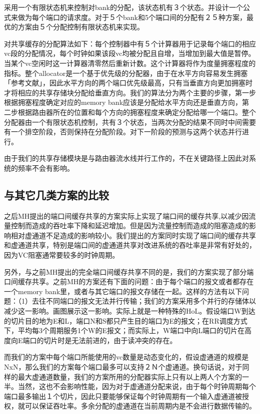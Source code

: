 ﻿\documentclass[10pt,journal]{IEEEtran}
\begin{document}
采用一个有限状态机来控制对bank的分配，该状态机有３个状态。并设计一个公式来做为每个端口的请求度。对于５个bank和5个端口间的分配有２５种方案，最优的方案由５个分配控制有限状态机来实现。

对共享缓存的分配算法如下：每个控制器中有５个计算器用于记录每个端口的相应vc段的分配情况，每个时钟如果该段vc均被分配且自增，当增加到最大值是暂停。当某个vc空闲时这一计算器清零然后重新计数。这个计算器将作为度量拥塞程度的指标。整个allocator是一个基于优先级的分配器，由于在水平方向容易发生拥塞「参考文献」，因此水平方向的两个端口优先级最高，只有当垂直方向更加拥塞时才将相应的共享存储块分配给垂直方向。我们的算法分为两个主要的步骤，第一步根据拥塞程度确定对应的memory bank应该是分配给水平方向还是垂直方向，第二步根据路由器所在的位置和每个方向的拥塞程度来确定分配给哪一个端口。整个分配器由一个有限状态机控制，共有３个状态，当两次分配的结果不同时中间需要有一个排空阶段，否则保持在分配阶段。对下一阶段的预测与这两个状态并行进行。

由于我们的共享存储模块是与路由器流水线并行工作的，不在关键路径上因此对系统的频率不会有影响。

\subsection{与其它几类方案的比较}
之后MH提出的端口间缓存共享的方案实际上实现了端口间的缓存共享,以减少因流量控制而造成的吞吐率下降和延迟增加。但是因为流量控制而造成的阻塞造成的影响相对虚通道不足造成的影响较小。我们提出的方案同时实现了端口间的缓存共享和虚通道共享，特别是端口间的虚通道共享对改进系统的吞吐率是非常有好处的，因为VC阻塞通常要较多的时钟周期。

另外，与之前MH提出的完全端口间缓存共享不同的是，我们的方案实现了部分端口间缓存共享。之前MH的方案还有下面的问题：由于每个端口的报文或者都存在一个memory bank里，或者与其它端口的报文存储在一起。这样的方法有以下问题：（1）去往不同端口的报文无法并行传输；我们的方案采用多个并行的存储体以减少这一影响。画图展示这一影响。实际上就是一种特殊的HoL。假设端口W到达的切片目的地为E和L，端口N和S都只产生目的端口为E的报文；在RR调度方式下，平均每3个周期服务1个W的E报文；而实际上，W端口中向L端口的切片在高度向E端口的切片时是无法前进的，由于读冲突的存在。

而我们的方案中每个端口所能使用的vc数量是动态变化的，假设虚通道的规模是NxN，那么我们的方案每个端口最多可以支持２Ｎ个虚通道。换句话说，对于同样的最大虚通道数量，我们的方案所用的分配器实际上只有以上两人个方案的一半。当然，这也不会影响性能，因为对于虚通道分配来说，由于每个时钟周期每个端口最多输出１个切片，因此只要能够保证每个时钟周期有一个输入虚通道被授权，就可以保证吞吐率。多余分配的虚通道在当前周期内是不会进行数据传输的。
\end{document}
